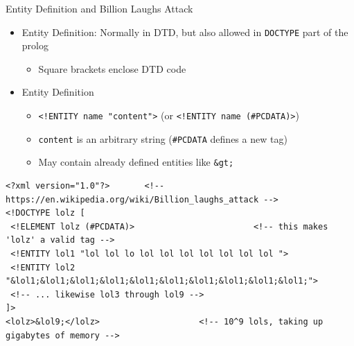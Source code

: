 
\begin{frame}[fragile]{Entity Definition and Billion Laughs Attack}
%
\begin{itemize}
\item Entity Definition: Normally in DTD, but also allowed in \texttt{DOCTYPE} part of the prolog
	\begin{itemize}
	\item Square brackets enclose DTD code
	\end{itemize}
\pause
\item Entity Definition
	\begin{itemize}
	\item \texttt{<!ENTITY name "content">} (or \texttt{<!ENTITY name (#PCDATA)>})
	\item \texttt{content} is an arbitrary string (\texttt{\#PCDATA} defines a new tag)
	\item May contain already defined entities like \texttt{\&gt;}
	\end{itemize}
\end{itemize}
%
\pause
%
\begin{warnbox}[Billion Laughs Attack, leftupper=7mm]
\begin{verbatim}
<?xml version="1.0"?>       <!-- https://en.wikipedia.org/wiki/Billion_laughs_attack -->
<!DOCTYPE lolz [
 <!ELEMENT lolz (#PCDATA)>                        <!-- this makes 'lolz' a valid tag -->
 <!ENTITY lol1 "lol lol lo lol lol lol lol lol lol lol ">
 <!ENTITY lol2 "&lol1;&lol1;&lol1;&lol1;&lol1;&lol1;&lol1;&lol1;&lol1;&lol1;">
 <!-- ... likewise lol3 through lol9 -->
]>
<lolz>&lol9;</lolz>                    <!-- 10^9 lols, taking up gigabytes of memory -->
\end{verbatim}
\end{warnbox}
%
\end{frame}


